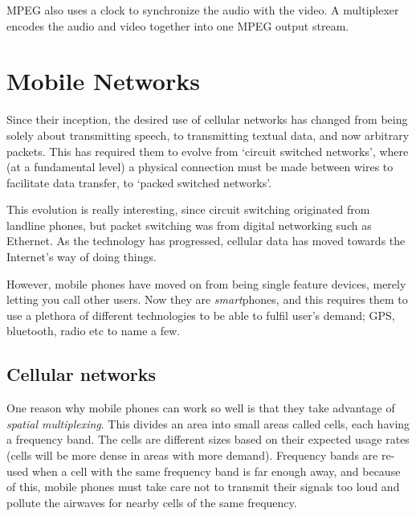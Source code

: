 MPEG also uses a clock to synchronize the audio with the video. A multiplexer
encodes the audio and video together into one MPEG output stream.


\section{Mobile Networks}

Since their inception, the desired use of cellular networks has changed from
being solely about transmitting speech, to transmitting textual data, and now
arbitrary packets. This has required them to evolve from `circuit switched
networks', where (at a fundamental level) a physical connection must be made
between wires to facilitate data transfer, to `packed switched networks'.

This evolution is really interesting, since circuit switching originated from
landline phones, but packet switching was from digital networking such as
Ethernet. As the technology has progressed, cellular data has moved towards the
Internet's way of doing things.

However, mobile phones have moved on from being single feature devices, merely
letting you call other users. Now they are \textit{smart}phones, and this
requires them to use a plethora of different technologies to be able to fulfil
user's demand; GPS, bluetooth, radio etc to name a few.

\subsection{Cellular networks}

One reason why mobile phones can work so well is that they take advantage of
\textit{spatial multiplexing}. This divides an area into small areas called
cells, each having a frequency band. The cells are different sizes based on
their expected usage rates (cells will be more dense in areas with more demand).
Frequency bands are re-used when a cell with the same frequency band is far
enough away, and because of this, mobile phones must take care not to transmit
their signals too loud and pollute the airwaves for nearby cells of the same
frequency.


